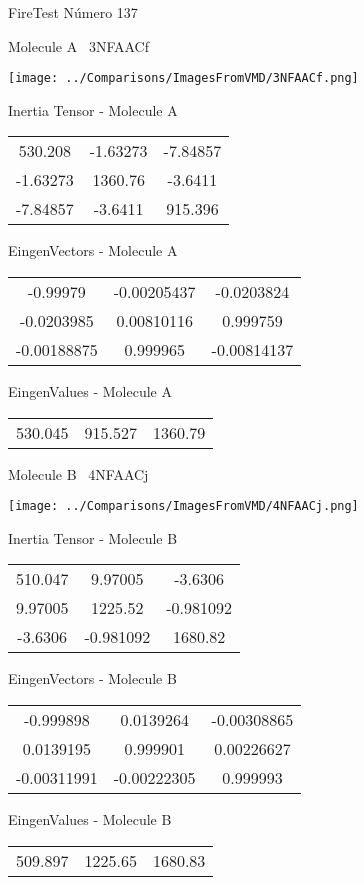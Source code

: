 \vtab[-3cm]
\begin{center}
{\large FireTest \tab Número 137}
\end{center}
\begin{multicols}{2}
\begin{center}

Molecule A \
3NFAACf

\texttt{[image: ../Comparisons/ImagesFromVMD/3NFAACf.png]}

Inertia Tensor - Molecule A \\
\begin{tabular}{|c c c|}
530.208	 & 	-1.63273	 & 	-7.84857	 \\
-1.63273	 & 	1360.76	 & 	-3.6411	 \\
-7.84857	 & 	-3.6411	 & 	915.396
\end{tabular}

\vtab
 EingenVectors - Molecule A     \\
\begin{tabular}{|c c c|}
-0.99979	 & 	-0.00205437	 & 	-0.0203824	 \\
-0.0203985	 & 	0.00810116	 & 	0.999759	 \\
-0.00188875	 & 	0.999965	 & 	-0.00814137
\end{tabular}

\vtab
 EingenValues - Molecule A     \\
\begin{tabular}{|c c c|}
530.045	 & 	915.527	 & 	1360.79	 \\
\end{tabular}
\columnbreak

Molecule B \
4NFAACj

\texttt{[image: ../Comparisons/ImagesFromVMD/4NFAACj.png]}

Inertia Tensor - Molecule B \\
\begin{tabular}{|c c c|}
510.047	 & 	9.97005	 & 	-3.6306	 \\
9.97005	 & 	1225.52	 & 	-0.981092	 \\
-3.6306	 & 	-0.981092	 & 	1680.82
\end{tabular}

\vtab
 EingenVectors - Molecule B     \\
\begin{tabular}{|c c c|}
-0.999898	 & 	0.0139264	 & 	-0.00308865	 \\
0.0139195	 & 	0.999901	 & 	0.00226627	 \\
-0.00311991	 & 	-0.00222305	 & 	0.999993
\end{tabular}

\vtab
 EingenValues - Molecule B     \\
\begin{tabular}{|c c c|}
509.897	 & 	1225.65	 & 	1680.83	 \\
\end{tabular}

\end{center}
\end{multicols}

